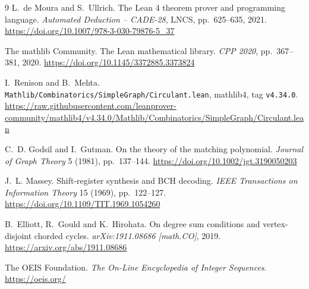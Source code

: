 \documentclass[11pt]{article}
\theoremstyle{definition}
\begin{document}
\begin{thebibliography}{9}
L.~de Moura and S.~Ullrich.
\newblock The Lean 4 theorem prover and programming language.
\newblock \emph{Automated Deduction -- CADE-28}, LNCS, pp.~625--635, 2021.
\url{https://doi.org/10.1007/978-3-030-79876-5_37}

The mathlib Community.
\newblock The Lean mathematical library.
\newblock \emph{CPP 2020}, pp.~367--381, 2020.
\url{https://doi.org/10.1145/3372885.3373824}

I.~Renison and B.~Mehta.
\newblock \texttt{Mathlib/Combinatorics/SimpleGraph/Circulant.lean}, mathlib4,
tag \texttt{v4.34.0}.
\newblock
\url{https://raw.githubusercontent.com/leanprover-community/mathlib4/v4.34.0/Mathlib/Combinatorics/SimpleGraph/Circulant.lean}

C.~D. Godsil and I.~Gutman.
\newblock On the theory of the matching polynomial.
\newblock \emph{Journal of Graph Theory} 5 (1981), pp.~137--144.
\url{https://doi.org/10.1002/jgt.3190050203}

J.~L. Massey.
\newblock Shift-register synthesis and BCH decoding.
\newblock \emph{IEEE Transactions on Information Theory} 15 (1969),
pp.~122--127.
\url{https://doi.org/10.1109/TIT.1969.1054260}

B.~Elliott, R.~Gould and K.~Hirohata.
\newblock On degree sum conditions and vertex-disjoint chorded cycles.
\newblock \emph{arXiv:1911.08686 [math.CO]}, 2019.
\url{https://arxiv.org/abs/1911.08686}

The OEIS Foundation.
\newblock \emph{The On-Line Encyclopedia of Integer Sequences}.
\newblock \url{https://oeis.org/}
\end{thebibliography}
\end{document}

